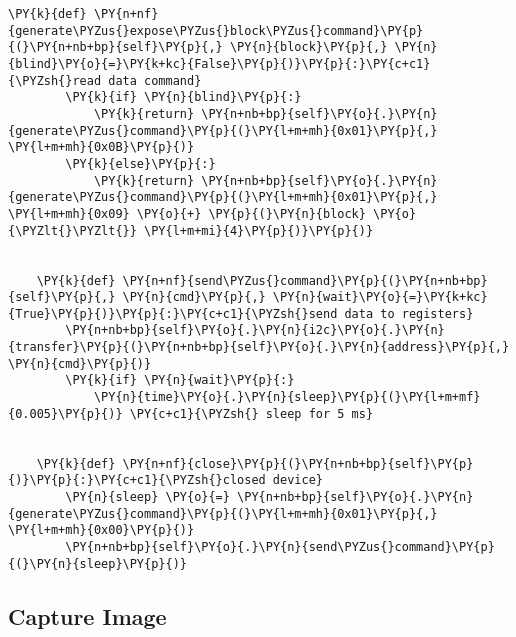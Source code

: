 \begin{tcolorbox}[breakable, size=fbox, boxrule=1pt, pad at break*=1mm,colback=cellbackground, colframe=cellborder]
\begin{Verbatim}[commandchars=\\\{\}]
	\PY{k}{def} \PY{n+nf}{generate\PYZus{}expose\PYZus{}block\PYZus{}command}\PY{p}{(}\PY{n+nb+bp}{self}\PY{p}{,} \PY{n}{block}\PY{p}{,} \PY{n}{blind}\PY{o}{=}\PY{k+kc}{False}\PY{p}{)}\PY{p}{:}\PY{c+c1}{\PYZsh{}read data command}
		\PY{k}{if} \PY{n}{blind}\PY{p}{:}
			\PY{k}{return} \PY{n+nb+bp}{self}\PY{o}{.}\PY{n}{generate\PYZus{}command}\PY{p}{(}\PY{l+m+mh}{0x01}\PY{p}{,} \PY{l+m+mh}{0x0B}\PY{p}{)}
		\PY{k}{else}\PY{p}{:}
			\PY{k}{return} \PY{n+nb+bp}{self}\PY{o}{.}\PY{n}{generate\PYZus{}command}\PY{p}{(}\PY{l+m+mh}{0x01}\PY{p}{,} \PY{l+m+mh}{0x09} \PY{o}{+} \PY{p}{(}\PY{n}{block} \PY{o}{\PYZlt{}\PYZlt{}} \PY{l+m+mi}{4}\PY{p}{)}\PY{p}{)}


	\PY{k}{def} \PY{n+nf}{send\PYZus{}command}\PY{p}{(}\PY{n+nb+bp}{self}\PY{p}{,} \PY{n}{cmd}\PY{p}{,} \PY{n}{wait}\PY{o}{=}\PY{k+kc}{True}\PY{p}{)}\PY{p}{:}\PY{c+c1}{\PYZsh{}send data to registers}
		\PY{n+nb+bp}{self}\PY{o}{.}\PY{n}{i2c}\PY{o}{.}\PY{n}{transfer}\PY{p}{(}\PY{n+nb+bp}{self}\PY{o}{.}\PY{n}{address}\PY{p}{,} \PY{n}{cmd}\PY{p}{)}
		\PY{k}{if} \PY{n}{wait}\PY{p}{:}
			\PY{n}{time}\PY{o}{.}\PY{n}{sleep}\PY{p}{(}\PY{l+m+mf}{0.005}\PY{p}{)} \PY{c+c1}{\PYZsh{} sleep for 5 ms}


	\PY{k}{def} \PY{n+nf}{close}\PY{p}{(}\PY{n+nb+bp}{self}\PY{p}{)}\PY{p}{:}\PY{c+c1}{\PYZsh{}closed device}
		\PY{n}{sleep} \PY{o}{=} \PY{n+nb+bp}{self}\PY{o}{.}\PY{n}{generate\PYZus{}command}\PY{p}{(}\PY{l+m+mh}{0x01}\PY{p}{,} \PY{l+m+mh}{0x00}\PY{p}{)}
		\PY{n+nb+bp}{self}\PY{o}{.}\PY{n}{send\PYZus{}command}\PY{p}{(}\PY{n}{sleep}\PY{p}{)}
\end{Verbatim}
\end{tcolorbox}

 \subsection{   Capture Image}

